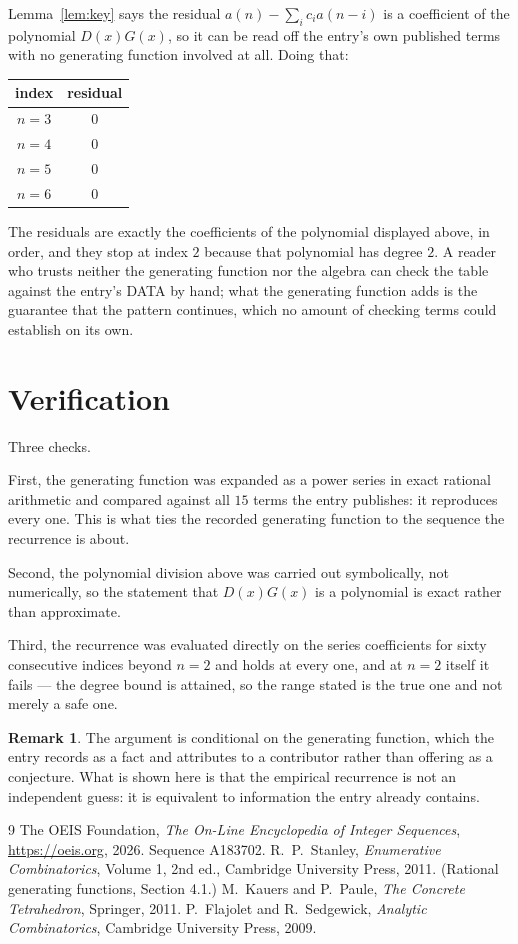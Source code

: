 \documentclass[11pt,a4paper]{article}
\theoremstyle{plain}
\theoremstyle{definition}
\newtheorem{remark}[theorem]{Remark}
\begin{document}
Lemma~\ref{lem:key} says the residual $a(n)-\sum_ic_ia(n-i)$ is a coefficient of the
polynomial $D(x)G(x)$, so it can be read off the entry's own published terms with no
generating function involved at all. Doing that:
\begin{center}
\begin{tabular}{cc}
index & residual \\ \hline
$n=3$ & $0$ \\
$n=4$ & $0$ \\
$n=5$ & $0$ \\
$n=6$ & $0$
\end{tabular}
\end{center}
The residuals are exactly the coefficients of the polynomial displayed above, in order, and
they stop at index $2$ because that polynomial has degree $2$. A reader who trusts
neither the generating function nor the algebra can check the table against the entry's DATA
by hand; what the generating function adds is the guarantee that the pattern continues, which
no amount of checking terms could establish on its own.

\section{Verification}

Three checks.

First, the generating function was expanded as a power series in exact rational arithmetic and
compared against all $15$ terms the entry publishes: it reproduces every one. This is
what ties the recorded generating function to the sequence the recurrence is about.

Second, the polynomial division above was carried out symbolically, not numerically, so the
statement that $D(x)G(x)$ is a polynomial is exact rather than approximate.

Third, the recurrence was evaluated directly on the series coefficients for sixty consecutive
indices beyond $n=2$ and holds at every one, and at $n=2$ itself it fails --- the
degree bound is attained, so the range stated is the true one and not merely a safe one.

\begin{remark}
The argument is conditional on the generating function, which the entry records as a fact and
attributes to a contributor rather than offering as a conjecture. What is shown here is that
the empirical recurrence is not an independent guess: it is equivalent to information the
entry already contains.
\end{remark}

\begin{thebibliography}{9}
 The OEIS Foundation, \emph{The On-Line Encyclopedia of Integer
Sequences}, \url{https://oeis.org}, 2026. Sequence A183702.
 R.~P.~Stanley, \emph{Enumerative Combinatorics}, Volume 1, 2nd ed.,
Cambridge University Press, 2011. (Rational generating functions, Section 4.1.)
 M.~Kauers and P.~Paule, \emph{The Concrete Tetrahedron}, Springer, 2011.
 P.~Flajolet and R.~Sedgewick, \emph{Analytic Combinatorics}, Cambridge
University Press, 2009.
\end{thebibliography}
\end{document}
